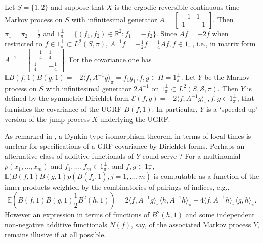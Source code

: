 \documentclass[11pt]{article}
\numberwithin{equation}{section}
\theoremstyle{definition}
\theoremstyle{remark}
\theoremstyle{definition}
\begin{document}
\begin{eg}\label{dirformeg}
Let $S=\{1,2\}$ and suppose that $X$ is the ergodic reversible 
continuous time Markov process
on $S$ with infinitesimal generator $A= \begin{bmatrix}-1 & 1\\
                                                          1 & -1\end{bmatrix}$.  
                                                          Then $\pi_1=\pi_2=\frac{1}{2}$ and $1_\pi^\perp=\{(f_1,f_2)\in\mathbb{R}^2: f_1=-f_2\}$.
                                                          Since $Af=-2f$ when restricted to $f\in1_\pi^\perp\subset L^2(S,\pi)$, 
$A^{-1}f=-\frac{1}{2}f = \frac{1}{4}Af, f\in1_\pi^\perp$, i.e., in matrix form
 $A^{-1}=   \begin{bmatrix}-\frac{1}{4} & \frac{1}{4}\\
                              \frac{1}{4} & -\frac{1}{4}\end{bmatrix}$.                                                     
  For the covariance one has $\mathbb{E}B(f,1)B(g,1) = -2\langle f,A^{-1}g\rangle_\pi
  = f_1g_1, f,g\in H=1_\pi^\perp$.
Let $Y$ be the Markov process on $S$ with infinitesimal generator
$2A^{-1}$ on $1_\pi^\perp\subset L^2(S,{\mathcal S},\pi)$. 
Then $Y$  is defined by  the 
 symmetric Dirichlet form $\mathcal{E}(f,g) =-2\langle f,A^{-1}g\rangle_\pi, f,g\in1_\pi^\perp$,
 that furnishes the covariance of the UGRF  
 $B(f,1)$. In particular, $Y$ is a  `speeded up' version of the jump process
 $X$ underlying the UGRF.                                 
\end{eg}

\begin{remark} As remarked in \cite{DiaconisEvans}, a Dynkin type isomorphism
theorem in terms of local times \cite{dynkiniso} is unclear for specifications of a GRF covariance by  
Dirichlet forms. 
Perhaps an alternative class of additive functionals of $Y$
could serve ? 
 For a multinomial $p(x_1,\dots,x_m)$
 and $f_1,\dots,f_m\in1_\pi^\perp$, and $f,g\in1_\pi^\perp$,
$\mathbb{E}(B(f,1)B(g,1)p(B(f_j,1),j=1,\dots,m)$ is computable 
 as a  function of the inner products
 weighted by the combinatorics of pairings of indices, e.g.,
\begin{equation}{\mathbb E}(B(f,1)B(g,1)\frac{1}{2}B^2(h,1))
= 2\langle f,A^{-1}g\rangle_\pi\langle h,A^{-1}h\rangle_\pi
+ 4\langle f,A^{-1}h\rangle_\pi\langle g,h\rangle_\pi.\end{equation}
However an expression in terms of functions of $B^2(h,1)$ and 
some independent
non-negative additive functionals $N(f)$, say, of the associated Markov process $Y$,
remains illusive if at all possible.
\end{remark}
\end{document}
